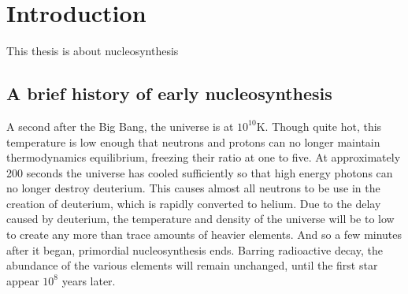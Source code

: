 
\chapter{Introduction}
\label{chap:intro}
This thesis is about nucleosynthesis

\section{A brief history of early nucleosynthesis}
A second after the Big Bang, the universe is at $10^10$K. Though quite hot, this temperature is low enough that neutrons and protons can no longer maintain thermodynamics equilibrium, freezing their ratio at one to five. At approximately 200 seconds the universe has cooled sufficiently so that high energy photons can no longer destroy deuterium. This causes almost all neutrons to be use in the creation of deuterium, which is rapidly converted to helium. Due to the delay caused by deuterium, the temperature and density of the universe will be to low to create any more than trace amounts of heavier elements. And so a few minutes after it began, primordial nucleosynthesis ends. Barring radioactive decay, the abundance of the various elements will remain unchanged, until the first star appear $10^8$ years later. 


